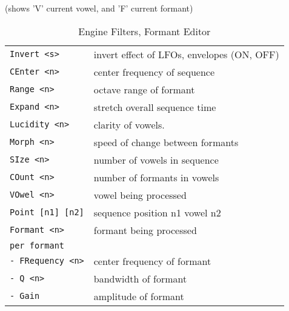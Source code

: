    \begin{table}[H]
      \centering
      \caption{Engine Filters, Formant Editor}
      (shows 'V' current vowel, and 'F' current formant)
      \label{table:yoshimi_engine_filters_formant_editor}
      \begin{tabular}{l l}

\texttt{Invert <s>} &
   invert effect of LFOs, envelopes (ON, OFF) \\
\texttt{CEnter <n>} &
   center frequency of sequence \\
\texttt{Range <n>} &
   octave range of formant \\
\texttt{Expand <n>} &
   stretch overall sequence time \\
\texttt{Lucidity <n>} &
   clarity of vowels. \\
\texttt{Morph <n>} &
   speed of change between formants \\
\texttt{SIze <n>} &
   number of vowels in sequence \\
\texttt{COunt <n>} &
   number of formants in vowels \\
\texttt{VOwel <n>} &
   vowel being processed \\
\texttt{Point [n1] [n2]} &
   sequence position n1 vowel n2 \\
\texttt{Formant <n>} &
   formant being processed \\
\texttt{per formant} &
    \\
\texttt{-  FRequency <n>} &
   center frequency of formant \\
\texttt{-  Q <n>} &
   bandwidth of formant \\
\texttt{-  Gain} &
   amplitude of formant \\
      \end{tabular}
   \end{table}

\pagebreak
